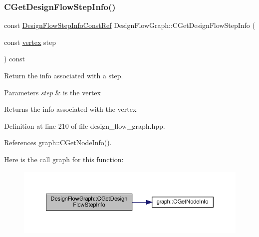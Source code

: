 \subsubsection{\texorpdfstring{C\+Get\+Design\+Flow\+Step\+Info()}{CGetDesignFlowStepInfo()}}
{\footnotesize\ttfamily const \hyperlink{design__flow__graph_8hpp_af21bbb295aec129537b90f4702020ee2}{Design\+Flow\+Step\+Info\+Const\+Ref} Design\+Flow\+Graph\+::\+C\+Get\+Design\+Flow\+Step\+Info (\begin{DoxyParamCaption}\item[{const \hyperlink{graph_8hpp_abefdcf0544e601805af44eca032cca14}{vertex}}]{step }\end{DoxyParamCaption}) const\hspace{0.3cm}{\ttfamily [inline]}}



Return the info associated with a step. 


\begin{DoxyParams}{Parameters}
{\em step} & is the vertex \\
\hline
\end{DoxyParams}
\begin{DoxyReturn}{Returns}
the info associated with the vertex 
\end{DoxyReturn}


Definition at line 210 of file design\+\_\+flow\+\_\+graph.\+hpp.



References graph\+::\+C\+Get\+Node\+Info().

Here is the call graph for this function\+:
\nopagebreak
\begin{figure}[H]
\begin{center}
\leavevmode
\includegraphics[width=350pt]{de/de0/classDesignFlowGraph_a04cf3b9917f596b49d6bc3aae722c896_cgraph}
\end{center}
\end{figure}
\mbox{\label{classDesignFlowGraph_a4f6d9efa952efe1ddde16382a7454a21}} 
